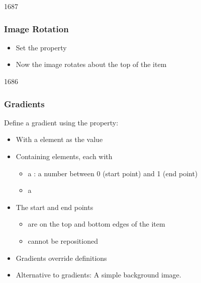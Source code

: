 
\begin{slide}{1687}\frametitle{Image Rotation}


\begin{itemize}
\item Set the  property
\item Now the image rotates about the top of the item
\end{itemize}

\end{slide}


\begin{slide}{1686}\frametitle{Gradients}

Define a gradient using the  property:

\begin{itemize}
\item With a  element as the value
\item Containing  elements, each with
  \begin{itemize}
  \item a : a number between 0 (start point) and 1 (end point)
  \item a 
  \end{itemize}
\item The start and end points
  \begin{itemize}
    \item are on the top and bottom edges of the item
    \item cannot be repositioned
  \end{itemize}
\item Gradients override  definitions
\item Alternative to gradients: A simple background image.
\end{itemize}

\end{slide}


